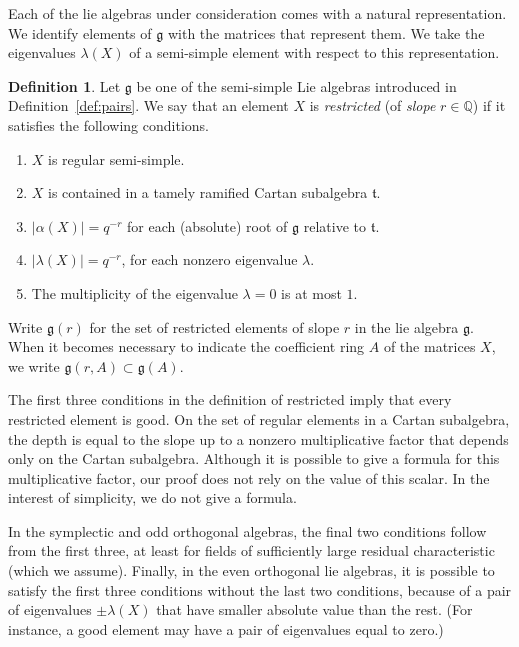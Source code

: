 \documentclass[11pt]{amsart}
\theoremstyle{definition}
\newtheorem{definition}[theorem]{Definition}
\theoremstyle{remark}
\numberwithin{equation}{theorem}
\def\tF{{\mathfrak{t}}}
\def\gF{{\mathfrak{g}}}
\newcommand{\ring}[1]{\mathbb{#1}}
\def\lie#1{{\mathfrak{#1}}}
\def\liegood#1{{\lie#1}}
\begin{document}
Each of the lie algebras under consideration comes with a natural
representation.  We identify elements of $\gF$ with the matrices
that represent them.  We take the eigenvalues $\lambda(X)$ of a
semi-simple element with respect to this representation.

\begin{definition}\label{def:vg}
Let $\lie{g}$ be one of the semi-simple Lie algebras introduced in
Definition~{\ref{def:pairs}}. We say that an element $X$ is {\it
restricted } (of \emph{slope} $r\in\ring{Q}$) if it satisfies the
following conditions.
   \begin{enumerate}
   \item $X$ is regular semi-simple.
   \item $X$ is contained in a tamely ramified Cartan subalgebra $\tF$.
   \item $|\alpha(X)|=q^{-r}$ for each (absolute) root of $\gF$ relative to
$\tF$.
   \item $|\lambda(X)| = q^{-r}$, for each nonzero eigenvalue
   $\lambda$.
   \item The multiplicity of the eigenvalue $\lambda=0$ is at most $1$.
   \end{enumerate}
Write $\liegood{g}(r)$ for the set of restricted  elements of
slope $r$ in the lie algebra $\lie{g}$.  When it becomes necessary
to indicate the coefficient ring $A$ of the matrices $X$, we write
$\liegood{g}(r,A)\subset \lie{g}(A)$.
\end{definition}

The first three conditions in the definition of restricted imply
that every restricted element is good.  On the set of regular
elements in a Cartan subalgebra, the depth is equal to the slope
up to a nonzero multiplicative factor that depends only on the
Cartan subalgebra.  Although it is possible to give a formula for
this multiplicative factor, our proof does not rely on the value
of this scalar.  In the interest of simplicity, we do not give a
formula.


In the symplectic and odd orthogonal algebras, the final two
conditions follow from the first three, at least for fields of
sufficiently large residual characteristic (which we assume).
Finally, in the even orthogonal lie algebras, it is possible to
satisfy the first three conditions without the last two
conditions, because of a pair of eigenvalues $\pm\lambda(X)$ that
have smaller absolute value than the rest. (For instance, a good
element may have a pair of eigenvalues equal to zero.)
\end{document}

